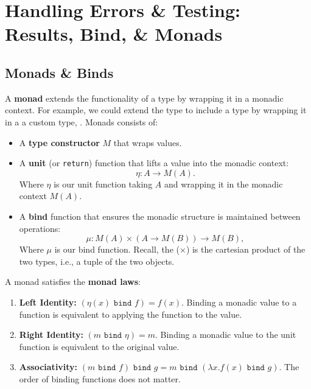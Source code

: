 \newpage
\section{Handling Errors \& Testing: Results, Bind, \& Monads}

\subsection{Monads \& Binds}
\begin{Def}[Monads]

    A \textbf{monad} extends the functionality of a type by wrapping it in a monadic context.
    For example, we could extend the type  to include a  type by wrapping it in a
    a custom type, .
    Monads consists of:
    \begin{itemize}
        \item A \textbf{type constructor} \( M \) that wraps values.
        \item A \textbf{unit} (or \texttt{return}) function that lifts a value into the monadic context:
        \[
        \eta : A \to M(A).
        \]
        \noindent
        Where \(\eta\) is our unit function taking $A$ and wrapping it in the monadic context $M(A)$.
        \item A \textbf{bind} function that ensures the monadic structure is maintained between operations:
        \[
        \mu : M(A) \times (A \to M(B)) \to M(B),
        \]
        \noindent
        Where \(\mu\) is our bind function. Recall,
        the ($\times$) is the cartesian product of the two types, i.e., a tuple of the two objects.
    \end{itemize}
\noindent
    A monad satisfies the \textbf{monad laws}:
    \begin{enumerate}
        \item \textbf{Left Identity:} \( \left(\eta(x) \texttt{ bind } f\right) = f(x) \). Binding a monadic value to a function is equivalent to applying the function to the value.
        \item \textbf{Right Identity:} \( (m \texttt{ bind } \eta) = m \). Binding a monadic value to the unit function is equivalent to the original value.
        \item \textbf{Associativity:} \( (m \texttt{ bind } f) \texttt{ bind } g = m \texttt{ bind } ( \lambda x. f(x) \texttt{ bind } g) \). The order of binding functions does not matter.
    \end{enumerate}


\end{Def}
